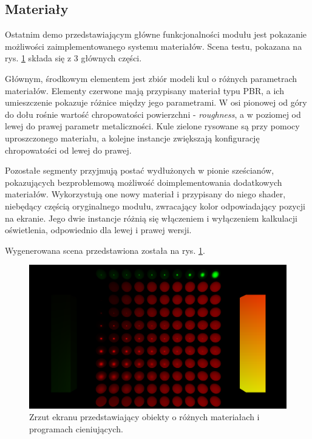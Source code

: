 \subsection{Materiały}
Ostatnim demo przedstawiającym główne funkcjonalności modułu jest pokazanie możliwości zaimplementowanego systemu materiałów. Scena testu, pokazana na rys. \ref{demo_materials} składa się z 3 głównych części.
 
Głównym, środkowym elementem jest zbiór modeli kul o różnych parametrach materiałów. Elementy czerwone mają przypisany materiał typu PBR, a ich umieszczenie pokazuje różnice między jego parametrami. W osi pionowej od góry do dołu rośnie wartość chropowatości powierzchni - \textit{roughness}, a w poziomej od lewej do prawej parametr metaliczności. Kule zielone rysowane są przy pomocy uproszczonego materiału, a kolejne instancje zwiększają konfigurację chropowatości od lewej do prawej. 

Pozostałe segmenty przyjmują postać wydłużonych w pionie sześcianów, pokazujących bezproblemową możliwość doimplementowania dodatkowych materiałów. Wykorzystują one nowy materiał i przypisany do niego shader, niebędący częścią oryginalnego modułu, zwracający kolor odpowiadający pozycji na ekranie. Jego dwie instancje różnią się włączeniem i wyłączeniem kalkulacji oświetlenia, odpowiednio dla lewej i prawej wersji. 

Wygenerowana scena przedstawiona została na rys. \ref{demo_materials}.

\begin{figure}[h!]
	\centering
	\includegraphics[width=\textwidth]{images/demo_materials.png}
	\caption{Zrzut ekranu przedstawiający obiekty o różnych materiałach i programach cieniujących.}
	\label{demo_materials}
\end{figure}